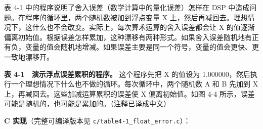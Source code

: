 表 4-1 中的程序说明了舍入误差（数学计算中的量化误差）怎样在 DSP
中造成问题。在程序的循环里，两个随机数被加到浮点变量 X
上，然后再减回去。理想情况下，这什么也不会改变。实际上，每次算术运算的舍入误差都会让
X
的值逐渐偏离初始值。根据误差怎样累加，这种漂移有两种形式。如果舍入误差随机地有正有负，变量的值会随机地增减。如果误差主要是同一个符号，变量的值会更快、更一致地漂移开。

\textbf{表 4-1　演示浮点误差累积的程序。} 这个程序先把 X 的值设为
1.000000，然后执行一个理想情况下什么也不做的循环。每次循环中，两个随机数
A 和 B 先加到 X 上，再减回去。这些加减运算累积的误差使 X
偏离初始值。如图 4-4
所示，误差可能是随机的，也可能是累加的。（注释已译成中文）

\begin{Shaded}
\begin{Highlighting}[]
\NormalTok{110 \textquotesingle{}}
\NormalTok{150 \textquotesingle{}}
\NormalTok{200 \textquotesingle{}}
\end{Highlighting}
\end{Shaded}

\textbf{C 实现}（完整可编译版本见
\texttt{c/table4-1\_float\_error.c}）：

